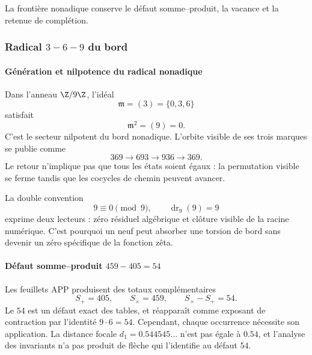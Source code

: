 \noindent La frontière nonadique conserve le défaut somme--produit, la vacance et la retenue de complétion.\par\medskip

\subsubsection{Radical \(3\! -\! 6\! -\! 9\) du bord}

\paragraph{Génération et nilpotence du radical nonadique}

Dans l'anneau \(\Z/9\Z\), l'idéal
\begin{equation}
\mathfrak m=(3)=\{0,3,6\}
\label{eq:radical-369}
\end{equation}
satisfait
\begin{equation}
\mathfrak m^2=(9)=0.
\label{eq:m-square-zero}
\end{equation}
C'est le secteur nilpotent du bord nonadique. L'orbite visible de ses trois
marques se publie comme
\[
369\longrightarrow693\longrightarrow936\longrightarrow369.
\]
Le retour n'implique pas que tous les états soient égaux : la permutation
visible se ferme tandis que les cocycles de chemin peuvent avancer.

La double convention
\[
9\equiv0\pmod9,
\qquad
\operatorname{dr}_9(9)=9
\]
exprime deux lecteurs : zéro résiduel algébrique et clôture visible de la racine
numérique. C'est pourquoi un neuf peut absorber une torsion de bord sans devenir
un zéro spécifique de la fonction zêta.

\paragraph{Défaut somme--produit \(459-405=54\)}

Les feuillets APP produisent des totaux complémentaires
\[
S_+=405,\qquad S_\times=459,\qquad S_\times-S_+=54.
\]
Le \(54\) est un défaut exact des tables, et réapparaît comme exposant de
contraction par l'identité \(9\cdot6=54\). Cependant, chaque occurrence
nécessite son application. La distance focale \(d_1=0.544545\ldots\) n'est pas égale à
\(0.54\), et l'analyse des invariants n'a pas produit de flèche qui
l'identifie au défaut \(54\).

